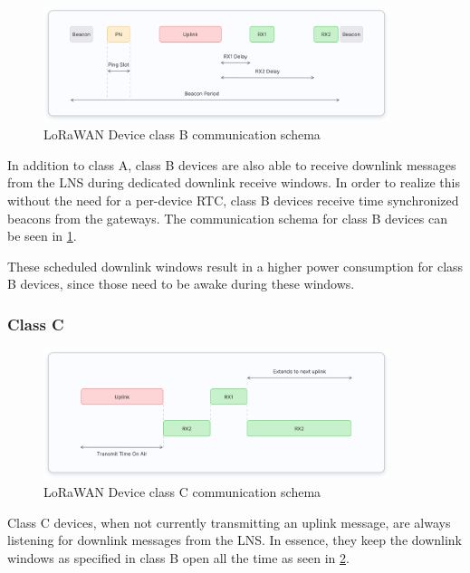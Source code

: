 \begin{figure}[h]
    \centering
    \includegraphics[width=0.9\textwidth]{pictures/device-classes/class-b.png}
    \caption{\ac{LoRaWAN} Device class B communication schema~\protect\cite{the_things_network_device_nodate}}
    \label{pic:lorawan-device-class-b-schema}
\end{figure}

In addition to class A, class B devices are also able to receive downlink messages from the \ac{LNS} during dedicated downlink receive windows.
In order to realize this without the need for a per-device \ac{RTC}, class B devices receive time synchronized beacons from the gateways.
The communication schema for class B devices can be seen in \cref{pic:lorawan-device-class-b-schema}.

These scheduled downlink windows result in a higher power consumption for class B devices, since those need to be awake during these windows.

\subsubsection{Class C}

\begin{figure}[h]
    \centering
    \includegraphics[width=0.9\textwidth]{pictures/device-classes/class-c.png}
    \caption{\ac{LoRaWAN} Device class C communication schema~\protect\cite{the_things_network_device_nodate}}
    \label{pic:lorawan-device-class-c-schema}
\end{figure}

Class C devices, when not currently transmitting an uplink message, are always listening for downlink messages from the \ac{LNS}.
In essence, they keep the downlink windows as specified in class B open all the time as seen in \cref{pic:lorawan-device-class-c-schema}.

